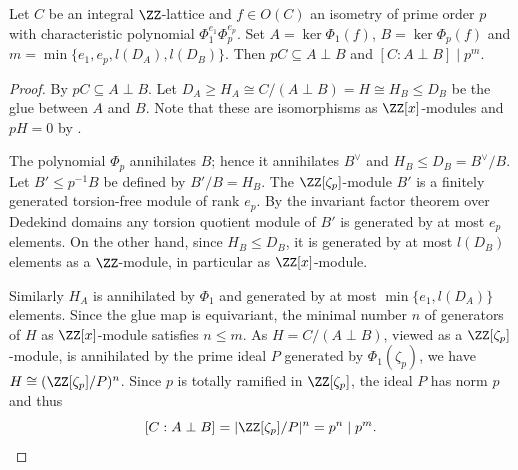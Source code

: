 
\begin{proposition}\label{glue:det-estimate}
Let $C$ be an integral $\ZZ$-lattice and $f \in O(C)$ an isometry of prime order $p$ with characteristic polynomial
$\Phi_1^{e_1}\Phi_p^{e_p}$.
Set $A= \ker \Phi_1(f)$, $B = \ker \Phi_p(f)$ and $m = \min\{e_1,e_p,l(D_A),l(D_B)\}$.
Then $pC \subseteq A \perp B$ and $[C: A\perp B] \mid p^m$.
\end{proposition}

\begin{proof}
By  $p C \subseteq A \perp B$.
Let $D_A \geq H_A \cong C/(A\perp B) =H\cong H_B \leq D_B$ be the glue between $A$ and $B$. Note that these are isomorphisms as $\ZZ[x]$-modules and $p H =0$ by .

The polynomial $\Phi_p$ annihilates $B$; hence it annihilates $B^\vee$ and $H_B \leq D_B=B^\vee/B$.
Let $B' \leq p^{-1}B$ be defined by $B'/B = H_B$.
The $\ZZ[\zeta_p]$-module $B'$ is a finitely generated torsion-free module of rank $e_p$.
  By the invariant factor theorem over Dedekind domains \cite[(22.13)]{curtis2006} any torsion quotient module of $B'$ is generated by at most $e_p$ elements.
On the other hand, since $H_B \leq D_B$, it is generated by at most $l(D_B)$ elements as a $\ZZ$-module, in particular as $\ZZ[x]$-module.

Similarly $H_A$ is annihilated by $\Phi_1$ and generated by at most $\min\{e_1,l(D_A)\}$ elements.
Since the glue map is equivariant, the minimal number $n$ of generators of $H$ as $\ZZ[x]$-module satisfies $n \leq m$.
As $H=C/(A\perp B)$, viewed as a $\ZZ[\zeta_p]$-module, is annihilated by the prime ideal $P$ generated by $\Phi_1(\zeta_p)$, we have $H\cong (\ZZ[\zeta_p]/P)^n$.
Since $p$ is totally ramified in $\ZZ[\zeta_p]$, the ideal $P$ has norm $p$ and thus
\[[C:A\perp B]=|\ZZ[\zeta_p]/P|^n = p^n \mid p^m. \qedhere\]
\end{proof}

